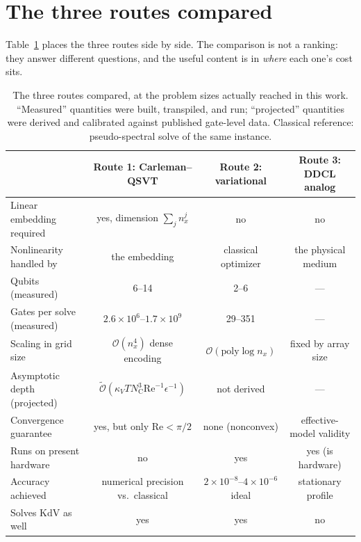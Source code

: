 \documentclass[aps,prx,twocolumn,notitlepage,superscriptaddress,floatfix,10pt]{revtex4-2}
\newcommand{\Rey}{\mathrm{Re}}
\newcommand{\Oh}{\mathcal{O}}
\newcommand{\Ot}{\widetilde{\mathcal{O}}}
\newcommand{\NC}{N_{\mathrm{C}}}
\begin{document}
\section{The three routes compared}
\label{sec:comparison}

Table~\ref{tab:comparison} places the three routes side by side. The comparison is not a ranking:
they answer different questions, and the useful content is in \emph{where} each one's cost sits.

\begin{table}[t]
\caption{The three routes compared, at the problem sizes actually reached in this work.
``Measured'' quantities were built, transpiled, and run; ``projected'' quantities were derived and
calibrated against published gate-level data. Classical reference: pseudo-spectral solve of the same
instance.}
\label{tab:comparison}
\begin{ruledtabular}
\begin{tabular}{lccc}
 & Route 1: Carleman--QSVT & Route 2: variational & Route 3: DDCL analog \\
\hline
Linear embedding required & yes, dimension $\sum_j n_x^j$ & no & no \\
Nonlinearity handled by & the embedding & classical optimizer & the physical medium \\
Qubits (measured) & 6--14 & 2--6 & --- \\
Gates per solve (measured) & $2.6\times10^{6}$--$1.7\times10^{9}$ & 29--351 & --- \\
Scaling in grid size & $\Oh(n_x^4)$ dense encoding & $\Oh(\mathrm{poly}\log n_x)$ & fixed by array size \\
Asymptotic depth (projected) & $\Ot(\kappa_V T\NC^3\Rey^{-1}\epsilon^{-1})$ & not derived & --- \\
Convergence guarantee & yes, but only $\Rey<\pi/2$ & none (nonconvex) & effective-model validity \\
Runs on present hardware & no & yes & yes (is hardware) \\
Accuracy achieved & numerical precision vs.\ classical & $2\times10^{-8}$--$4\times10^{-6}$ ideal & stationary profile \\
Solves KdV as well & yes & yes & no \\
\end{tabular}
\end{ruledtabular}
\end{table}
\end{document}

